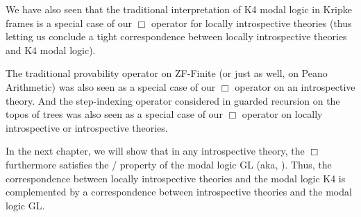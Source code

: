 We have also seen that the traditional interpretation of K4 modal logic in Kripke frames is a special case of our $\Box$ operator for locally introspective theories (thus letting us conclude a tight correspondence between locally introspective theories and K4 modal logic).

The traditional provability operator on ZF-Finite (or just as well, on Peano Arithmetic) was also seen as a special case of our $\Box$ operator on an introspective theory. And the step-indexing operator considered in guarded recursion on the topos of trees was also seen as a special case of our $\Box$ operator on locally introspective or introspective theories.

In the next chapter, we will show that in any introspective theory, the $\Box$ furthermore satisfies the \Loeb/ property of the modal logic GL (aka, ). Thus, the correspondence between locally introspective theories and the modal logic K4 is complemented by a correspondence between introspective theories and the modal logic GL.
\fileend